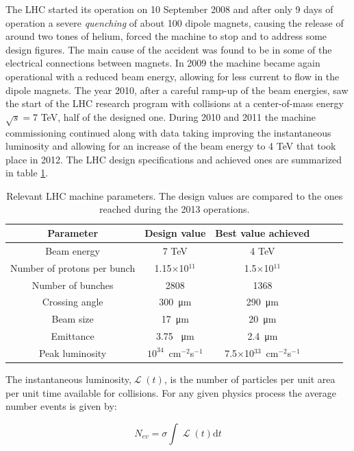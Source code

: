 The LHC started its operation on 10 September 2008 and after only 9 days of operation a severe \emph{quenching} of about 100 dipole magnets, causing the release of around two tones of helium, forced the machine to stop and to address some design figures. The main cause of the accident was found to be in some of the electrical connections between magnets. In 2009 the machine became again operational with a reduced beam energy, allowing for less current to flow in the dipole magnets. The year 2010, after a careful ramp-up of the beam energies, saw the start of the LHC research program with collisions at a center-of-mass energy $\sqrt{s} = 7$ TeV, half of the designed one. During 2010 and 2011 the machine commissioning continued along with data taking improving the instantaneous luminosity and allowing for an increase of the beam energy to 4 TeV that took place in 2012. The LHC design specifications and achieved ones are summarized in table \ref{tab:lhc_figures}.

\begin{table}[h!]
   \centering
  \caption{Relevant LHC machine parameters. The design values are compared to the ones reached during the 2013 operations.}
\begin{tabular}{c|ccccc}
\hline
Parameter & Design value&  Best value achieved \\ 
\hline
Beam energy   & 7 TeV & 4 TeV \\ 
Number of protons per bunch & 1.15$\times$10$^{11}$ & 1.5$\times$10$^{11}$ \\
Number of bunches & 2808 & 1368 \\
Crossing angle & 300~\si{\micro\metre} & 290~\si{\micro\metre} \\
Beam size & 17~\si{\micro\metre} & 20~\si{\micro\metre} \\
Emittance & 3.75 ~\si{\micro\metre} & 2.4~\si{\micro\metre}  \\
Peak luminosity & $10^{34}$~cm$^{-2}$s$^{-1}$ & 7.5$\times$10$^{33}$~cm$^{-2}$s$^{-1}$ \\
\hline
\end{tabular}
  \label{tab:lhc_figures}                
\end{table}


The instantaneous luminosity,$\operatorname{\mathcal{L}}(t)$, is the number of particles per unit area per unit time available for collisions. For any given physics process the average number events is given by:

\begin{equation} 
	N_{ev} = \sigma\int\operatorname{\mathcal{L}}(t)\mathrm{d}t
	\label{eq:n_events}
\end{equation} 

